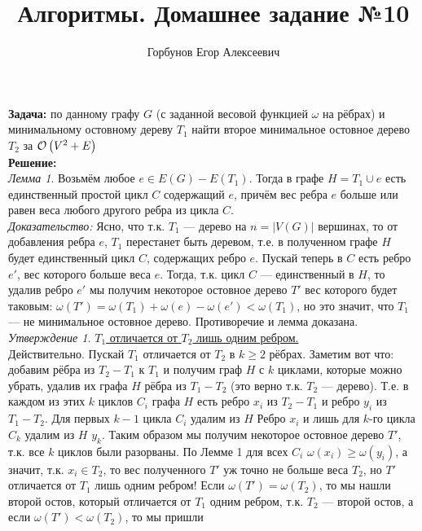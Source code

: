 
\title{Алгоритмы. Домашнее задание №10}
\author{Горбунов Егор Алексеевич}


\maketitle

\textbf{Задача:} по данному графу $G$ (с заданной весовой функцией $\omega$ на рёбрах) и минимальному остовному 
дереву $T_1$ найти второе минимальное остовное дерево $T_2$ за $\mathcal{O}\left(V^2 + E\right)$\\
\textbf{Решение:}\\
\textit{Лемма 1}. Возьмём любое $e \in E(G)-E(T_1)$. Тогда в графе $H = T_1 \cup e$ есть единственный простой цикл $C$ 
содержащий $e$, причём вес ребра $e$ больше или равен веса любого другого ребра из цикла $C$.\\
\textit{Доказательство:} Ясно, что т.к. $T_1$ --- дерево на $n = |V(G)|$ вершинах, то от добавления ребра $e$, $T_1$ 
перестанет быть деревом, т.е. в полученном графе $H$ будет единственный цикл $C$, содержащих ребро $e$. 
Пускай теперь в $C$ есть ребро $e'$, вес которого больше веса $e$. Тогда, т.к. цикл $C$ --- единственный в $H$, то удалив
ребро $e'$ мы получим некоторое остовное дерево $T'$ вес которого будет таковым: $\omega(T') = \omega(T_1)+\omega(e)-\omega(e') < \omega(T_1)$,
но это значит, что $T_1$ --- не минимальное остовное дерево. Противоречие и лемма доказана. \xqed\\
\textit{Утверждение 1.} \underline{$T_1$ отличается от $T_2$ лишь одним ребром.}\\
Действительно. Пускай $T_1$ отличается от $T_2$ в $k\geq 2$ рёбрах. Заметим вот что: добавим рёбра из $T_2-T_1$ к $T_1$
и получим граф $H$ с $k$ циклами, которые можно убрать, удалив их графа $H$ рёбра из $T_1-T_2$ (это верно т.к. $T_2$ --- дерево).
Т.е. в каждом из этих $k$ циклов $C_i$ графа $H$ есть ребро $x_i$ из $T_2-T_1$ и ребро $y_i$ из $T_1-T_2$. Для первых $k-1$
цикла $C_i$ удалим из $H$ Ребро $x_i$ и лишь для $k$-го цикла $C_k$ удалим из $H$ $y_k$.
Таким образом мы получим некоторое остовное дерево $T'$, т.к. все $k$ циклов были разорваны.
По Лемме 1 для всех $C_i$ $\omega(x_i) \geq \omega(y_i)$, а значит, т.к. $x_i \in T_2$, то вес полученного $T'$ уж точно
не больше веса $T_2$, но $T'$ отличается от $T_1$ лишь одним ребром! Если $\omega(T')=\omega(T_2)$, то мы нашли второй 
остов, который отличается от $T_1$ одним ребром, т.к. $T_2$ --- второй остов, а если $\omega(T')<\omega(T_2)$, то мы пришли 
